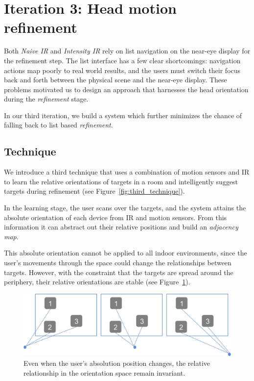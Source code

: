 \section{Iteration 3: Head motion refinement}
\label{sec:iteration-3:-head}

Both {\em Naive IR} and {\em Intensity IR} rely on list navigation on the near-eye display for the refinement step. The list interface has a few clear shortcomings: navigation actions map poorly to real world results, and the users must switch their focus back and forth between the physical scene and the near-eye display. These problems motivated us to design an approach that harnesses the head orientation during the {\em refinement} stage.

In our third iteration, we build a system which further minimizes the chance of falling back to list based {\em refinement}.

\subsection{Technique}

We introduce a third technique that uses a combination of motion sensors and IR to learn the relative orientations of
targets in a room and intelligently suggest targets during refinement (see
Figure~\ref{fig:third_technique}).

In the learning stage, the user scans over the targets, and the
system attains the absolute orientation of each device from IR and motion sensors. From this information it can abstract out their relative positions and build an {\em adjacency map}.

This absolute orientation cannot be applied to all indoor
environments, since the user’s movements through the space could change the relationships between targets. However, with the constraint that the targets are spread around the periphery, their relative orientations are stable
(see Figure~\ref{fig:third_principle}). 

\begin{figure}[t]
\centering
\includegraphics[width=1\columnwidth]{figures/third_principle.png}
\caption{Even when the user's absolution position changes, the relative relationship in the orientation space remain invariant.}
\label{fig:third_principle}
\end{figure}

